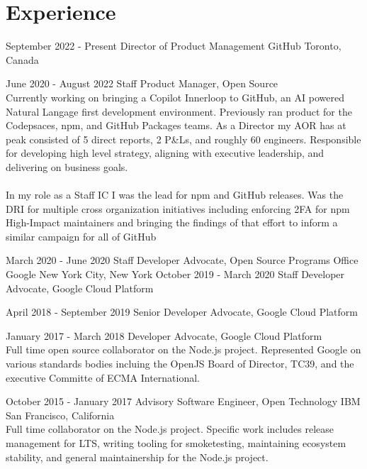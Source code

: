 \documentclass[10pt,a4paper,sans]{moderncv}   %
\begin{document}
\makecvtitle

\section{Experience}

\cventry
  {September 2022 - Present}
  {Director of Product Management}
  {GitHub}
  {Toronto, Canada}{}
  {}

\cventry
  {June 2020 - August 2022}
  {Staff Product Manager, Open Source}
  {}
  {}{}
  {
    \vphantom{0}\\
    Currently working on bringing a Copilot Innerloop to GitHub, an AI powered Natural Langage first development environment.
    Previously ran product for the Codepsaces, npm, and GitHub Packages teams. As a Director
    my AOR has at peak consisted of 5 direct reports, 2 P\&Ls, and roughly 60 engineers. Responsible
    for developing high level strategy, aligning with executive leadership, and delivering on business goals.
    \\\\
    In my role as a Staff IC I was the lead for npm and GitHub releases. Was the DRI for multiple cross organization
    initiatives including enforcing 2FA for npm High-Impact maintainers and bringing the findings
    of that effort to inform a similar campaign for all of GitHub
    \\
  }

\cventry
  {March 2020 - June 2020}
  {Staff Developer Advocate, Open Source Programs Office}
  {Google}
  {New York City, New York}{}
  {}
\cventry
  {October 2019 - March 2020}
  {Staff Developer Advocate, Google Cloud Platform}
  {}
  {}{}
  {}

\cventry
  {April 2018 - September 2019}
  {Senior Developer Advocate, Google Cloud Platform}
  {}
  {}{}
  {}

\cventry
  {January 2017 - March 2018}
  {Developer Advocate, Google Cloud Platform}
  {}
  {}{}
  {
    \vphantom{0}\\
    Full time open source collaborator on the Node.js project.
    Represented Google on various standards bodies incluing the OpenJS Board of Director,
    TC39, and the executive Committe of ECMA International.
    \\
  }

  \cventry
  {October 2015 - January 2017}
  {Advisory Software Engineer, Open Technology}
  {IBM}
  {San Francisco, California}{}
  {
    \vphantom{0}\\
    Full time collaborator on the Node.js project. Specific work includes release management for LTS, writing tooling for smoketesting, maintaining ecosystem stability, and general maintainership for the Node.js project.
    \\
  }
\end{document}
